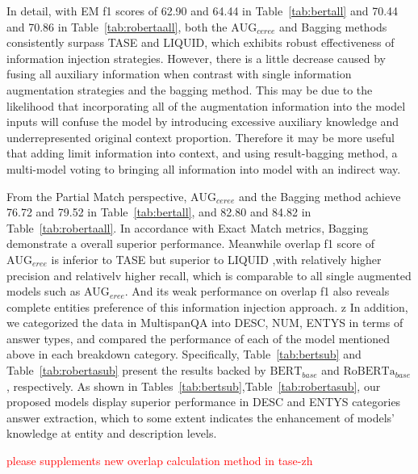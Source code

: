 \documentclass[a4paper,fleqn]{cas-dc}
\newcommand{\1}[1]{\mathds{1}\left[#1\right]}
\begin{document}
	In detail, with EM f1 scores of 62.90 and 64.44 in Table~\ref{tab:bertall} and 70.44 and 70.86 in Table~\ref{tab:robertaall}, both the $\text{AUG}_{ceree}$ and Bagging methods consistently surpass TASE and LIQUID, which exhibits robust effectiveness of information injection strategies. However, there is a little decrease caused by fusing all auxiliary information when contrast with single information augmentation strategies and the bagging method. This may be due to the likelihood that incorporating all of the augmentation information into the model inputs will confuse the model by introducing excessive auxiliary knowledge and underrepresented original context proportion. Therefore it may be more useful that adding limit information into context, and using result-bagging method, a multi-model voting to bringing all information into model with an indirect way.
	
	From the Partial Match perspective, $\text{AUG}_{ceree}$ and the Bagging method achieve 76.72 and 79.52 in Table~\ref{tab:bertall}, and 82.80 and 84.82 in Table~\ref{tab:robertaall}. In accordance with Exact Match metrics, Bagging demonstrate a overall superior performance. Meanwhile overlap f1 score of $\text{AUG}_{eree}$ is inferior to TASE but superior to LIQUID ,with relatively higher precision and relativelv higher recall, which  is comparable to all single augmented models such as $\text{AUG}_{eree}$. And its weak performance on overlap f1 also reveals complete entities preference of this information injection approach.
	z
	In addition, we	categorized the data in MultispanQA into DESC, NUM, ENTYS in terms of answer types, and compared the performance of each of the model mentioned above in each breakdown category. Specifically,  Table~\ref{tab:bertsub} and Table~\ref{tab:robertasub} present the results backed by  $\text{BERT}_{base}$ and $\text{RoBERTa}_{base}$, respectively. As shown in Tables~\ref{tab:bertsub},Table~\ref{tab:robertasub}, our proposed models display superior performance in DESC and ENTYS categories answer extraction, which to some extent indicates the enhancement of models' knowledge at entity and description levels.
	
	\textcolor{red}{please supplements new overlap calculation method in tase-zh}
	
\end{document}
